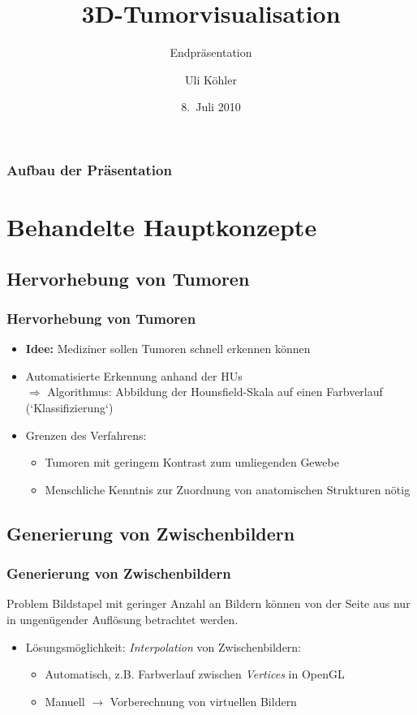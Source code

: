 \documentclass[14pt]{beamer}
\title{3D-Tumorvisualisation}
\subtitle{Endpräsentation}
\author{Uli Köhler}
\institute[EMG]{Ernst-Mach-Gymnasium Haar}
\date{8.~Juli 2010}
\begin{document}
\frame{\titlepage}
\begin{frame}
\frametitle{Aufbau der Präsentation}
\tableofcontents
\end{frame}
\section{Behandelte Hauptkonzepte}
\subsection{Hervorhebung von Tumoren}
\begin{frame}[allowframebreaks]
 \frametitle{Hervorhebung von Tumoren}
    \begin{itemize}
     \item \textbf{Idee:} Mediziner sollen Tumoren schnell erkennen können
     \item Automatisierte Erkennung anhand der HUs\\
	  $\Rightarrow$ Algorithmus: Abbildung der Hounsfield-Skala auf einen Farbverlauf (`Klassifizierung`)
     \item Grenzen des Verfahrens:
      \begin{itemize}
	\item Tumoren mit geringem Kontrast zum umliegenden Gewebe
	\item Menschliche Kenntnis zur Zuordnung von anatomischen Strukturen nötig
      \end{itemize}
    \end{itemize}
\end{frame}
\subsection{Generierung von Zwischenbildern}
\begin{frame}[allowframebreaks]
 \frametitle{Generierung von Zwischenbildern}
      \begin{block}{Problem}
	      Bildstapel mit geringer Anzahl an Bildern können von der Seite aus nur in ungenügender
	      Auflösung betrachtet werden.
      \end{block}
    \begin{itemize}
     \item Lösungsmöglichkeit: \textit{Interpolation} von Zwischenbildern:
      \begin{itemize}
	\item Automatisch, z.B. Farbverlauf zwischen \textit{Vertices} in OpenGL
	\item Manuell $\rightarrow$ Vorberechnung von virtuellen Bildern
      \end{itemize}
    \end{itemize}
\end{frame}
\end{document}

